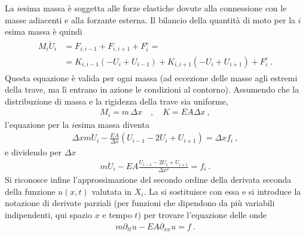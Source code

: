 \documentclass[letterpaper,10pt,italian]{jupyterBook}
\begin{document}
\sphinxAtStartPar
La \(i\)\sphinxhyphen{}esima massa è soggetta alle forze elastiche dovute alla connessione con le masse adiacenti e alla forzante esterna. Il bilancio della quantità di moto per la \(i\)\sphinxhyphen{}esima massa è quindi
\begin{equation*}
\begin{split}\begin{aligned}
  M_i \ddot{U}_i 
  & = F_{i,i-1} + F_{i,i+1} + F^e_i = \\
  & = K_{i,i-1} \left( - U_i + U_{i-1} \right) + K_{i,i+1} \left( - U_i + U_{i+1} \right) + F^e_i \ .
\end{aligned}\end{split}
\end{equation*}
\sphinxAtStartPar
Questa equazione è valida per ogni massa (ad eccezione delle masse agli estremi della trave, ma lì entrano in azione le condizioni al contorno). Assumendo che la distribuzione di massa e la rigidezza della trave sia uniforme,
\begin{equation*}
\begin{split}M_i = m \, \Delta x \quad , \quad K = {EA}{\Delta x} \ ,\end{split}
\end{equation*}
\sphinxAtStartPar
l’equazione per la \(i\)\sphinxhyphen{}esima massa diventa
\begin{equation*}
\begin{split}\Delta x m \ddot{U}_i - \frac{EA}{\Delta x} \left( U_{i-1} - 2 U_i + U_{i+1} \right) = \Delta x f_i \ ,\end{split}
\end{equation*}
\sphinxAtStartPar
e dividendo per \(\Delta x\)
\begin{equation*}
\begin{split}m \ddot{U}_i - EA \frac{U_{i-1}- 2 U_i + U_{i+1}}{\Delta x^2} = f_i \ .\end{split}
\end{equation*}
\sphinxAtStartPar
Si riconosce infine l’approssimazione del secondo ordine della derivata seconda della funzione \(u(x,t)\) valutata in \(X_i\). La si sostituisce con essa e si introduce la notazione di derivate parziali (per funzioni che dipendono da più variabili indipendenti, qui spazio \(x\) e tempo \(t\)) per trovare l’equazione delle onde
\begin{equation*}
\begin{split}m \partial_{tt} u - EA \partial_{xx} u = f \ .\end{split}
\end{equation*}
\end{document}
